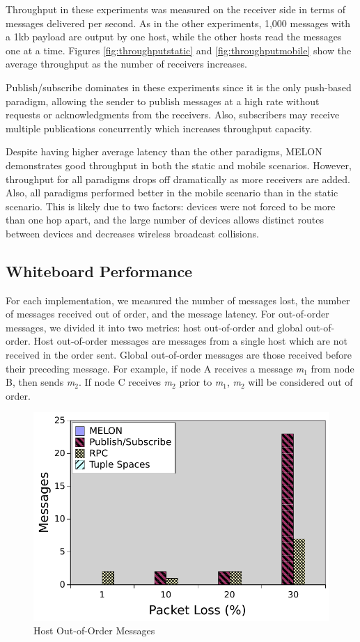 Throughput in these experiments was measured on the receiver side in terms of messages delivered per second. As in the other experiments, 1,000 messages with a 1kb payload are output by one host, while the other hosts read the messages one at a time. Figures \ref{fig:throughputstatic} and \ref{fig:throughputmobile} show the average throughput as the number of receivers increases.

Publish/subscribe dominates in these experiments since it is the only push-based paradigm, allowing the sender to publish messages at a high rate without requests or acknowledgments from the receivers. Also, subscribers may receive multiple publications concurrently which increases throughput capacity.

Despite having higher average latency than the other paradigms, MELON demonstrates good throughput in both the static and mobile scenarios. However, throughput for all paradigms drops off dramatically as more receivers are added. Also, all paradigms performed better in the mobile scenario than in the static scenario. This is likely due to two factors: devices were not forced to be more than one hop apart, and the large number of devices allows distinct routes between devices and decreases wireless broadcast collisions.


\subsection{Whiteboard Performance}

For each implementation, we measured the number of messages lost, the number of messages received out of order, and the message latency. For out-of-order messages, we divided it into two metrics: host out-of-order and global out-of-order. Host out-of-order messages are messages from a single host which are not received in the order sent. Global out-of-order messages are those received before their preceding message. For example, if node A receives a message \textit{m}$_{1}$ from node B, then sends \textit{m}$_{2}$. If node C receives \textit{m}$_{2}$ prior to \textit{m}$_{1}$, \textit{m}$_{2}$ will be considered out of order.

\begin{figure}
\centering
\includegraphics[width = \textwidth]{figures/hooo.pdf}
\caption{Host Out-of-Order Messages}
\label{fig:hooo}
\end{figure}


